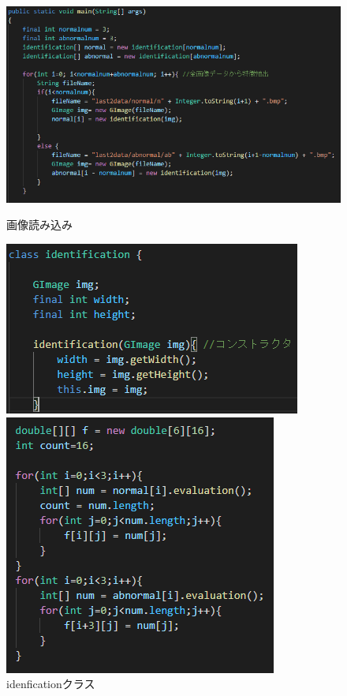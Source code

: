 \begin{figure}[htbp]
  \begin{minipage}[t]{0.45\hsize}
    \includegraphics[scale=0.4]{画像読み込み.PNG}
    \centering
    \caption{画像読み込み}
    \label{graph:1}
  \end{minipage}
  \begin{minipage}[t]{0.25\hsize}
    \includegraphics[scale=0.4]{クラス.PNG}
    \centering
    \caption{idenficationクラス}
    \label{graph:2}
  \end{minipage}
  \begin{minipage}[t]{0.25\hsize}
    \includegraphics[scale=0.4]{評価関数呼び出し.PNG}

\end{minipage}
\end{figure}
